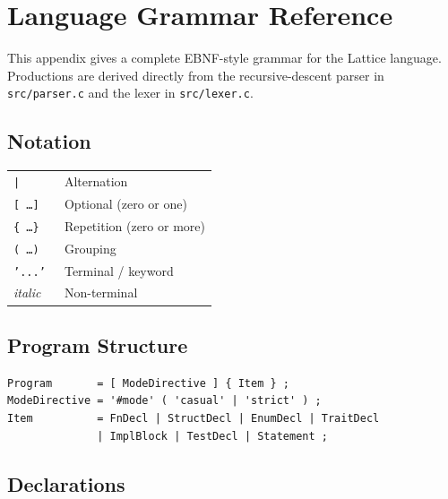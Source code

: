 \chapter{Language Grammar Reference}\label{ch:grammar-reference}

This appendix gives a complete EBNF-style grammar for the Lattice language.
Productions are derived directly from the recursive-descent parser in
\texttt{src/parser.c} and the lexer in \texttt{src/lexer.c}.

\section{Notation}

\begin{tabular}{@{}ll@{}}
\texttt{|}          & Alternation \\
\texttt{[ \ldots ]} & Optional (zero or one) \\
\texttt{\{ \ldots \}} & Repetition (zero or more) \\
\texttt{( \ldots )} & Grouping \\
\texttt{'...' }     & Terminal / keyword \\
\textit{italic}     & Non-terminal \\
\end{tabular}


\section{Program Structure}

\begin{lstlisting}[style=ebnf]
Program       = [ ModeDirective ] { Item } ;
ModeDirective = '#mode' ( 'casual' | 'strict' ) ;
Item          = FnDecl | StructDecl | EnumDecl | TraitDecl
              | ImplBlock | TestDecl | Statement ;
\end{lstlisting}


\section{Declarations}

